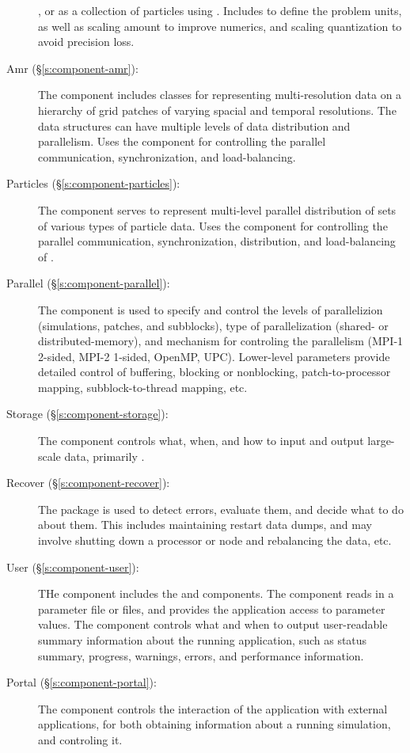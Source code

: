 \begin{description}
        , or as a collection of particles using
        .  Includes  to define the problem
        units, as well as scaling amount to improve numerics, and
        scaling quantization to avoid precision loss.
%
 \item [Amr (\S\ref{s:component-amr}): ]
%
        The  component includes classes for representing
        multi-resolution data on a hierarchy of grid patches of
        varying spacial and temporal resolutions.  The  data
        structures can have multiple levels of data distribution and
        parallelism.  Uses the  component for
        controlling the parallel communication, synchronization, and
        load-balancing.
%
 \item [Particles (\S\ref{s:component-particles}): ]
%
        The  component serves to represent multi-level
        parallel distribution of sets of various types of particle
        data.  Uses the  component for controlling the
        parallel communication, synchronization, distribution, and
        load-balancing of .
%
 \item [Parallel (\S\ref{s:component-parallel}): ]
%
        The  component is used to specify and control
        the levels of parallelizion (simulations, patches, and
        subblocks), type of parallelization (shared- or
        distributed-memory), and mechanism for controling the
        parallelism (MPI-1 2-sided, MPI-2 1-sided, OpenMP, UPC).
        Lower-level parameters provide detailed control of buffering,
        blocking or nonblocking, patch-to-processor mapping,
        subblock-to-thread mapping, etc.
%
 \item [Storage (\S\ref{s:component-storage}): ]
%
        The  component controls what, when, and how to
        input and output large-scale data, primarily .
%
 \item [Recover (\S\ref{s:component-recover}): ]
%
        The  package is used to detect errors, evaluate
        them, and decide what to do about them.  This includes
        maintaining restart data dumps, and may involve shutting down
        a processor or node and rebalancing the data, etc.
%
 \item [User (\S\ref{s:component-user}): ]
%
        THe  component includes the  and
         components.  The  component
        reads in a parameter file or files, and provides the
        application access to parameter values.  The 
        component controls what and when to output user-readable
        summary information about the running application, such as
        status summary, progress, warnings, errors, and performance
        information.
%
 \item [Portal (\S\ref{s:component-portal}): ]
%
        The  component controls the interaction of the
        application with external applications, for both obtaining
        information about a running simulation, and controling it.
\end{description}

